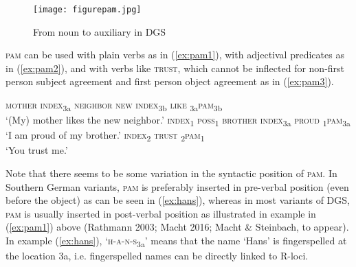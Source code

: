 \documentclass[11pt,a4paper,fleqn]{article}
\begin{document}
\begin{figure}[h]
    \centering
	\texttt{[image: figurepam.jpg]}
    \caption{From noun to auxiliary in DGS} \label{fig:schwan4}
\end{figure}


\textsc{pam} can be used with plain verbs as in (\ref{ex:pam1}), with adjectival predicates as in (\ref{ex:pam2}), and with verbs like \textsc{trust}, which cannot be inflected for non-first person subject agreement and first person object agreement as in (\ref{ex:pam3}).


\begin{exe}
\ex  \label{ex:pam}
\begin{xlist}	
\ex \textsc{mother}  \textsc{index}\textsubscript{3a}  \textsc{neighbor new}  \textsc{index}\textsubscript{3b} \textsc{like}   \textsubscript{3a}\textsc{pam}\textsubscript{3b}	\\
		‘(My) mother likes the new neighbor.’ \label{ex:pam1}
	\ex	\textsc{index}\textsubscript{1}  \textsc{poss}\textsubscript{1}  \textsc{brother}  \textsc{index}\textsubscript{3a}  \textsc{proud}   \textsubscript{1}\textsc{pam}\textsubscript{3a}\\
		‘I am proud of my brother.’ \label{ex:pam2}
	\ex	\textsc{index}\textsubscript{2}  \textsc{trust}   \textsubscript{2}\textsc{pam}\textsubscript{1}\\
		‘You trust me.’	\label{ex:pam3}
\end{xlist}
\end{exe}

%

Note that there seems to be some variation in the syntactic position of \textsc{pam}. In Southern German variants, \textsc{pam} is preferably inserted in pre-verbal position (even before the object) as can be seen in (\ref{ex:hans}), whereas in most variants of DGS, \textsc{pam} is usually inserted in post-verbal position as illustrated in example in (\ref{ex:pam1}) above (Rathmann 2003; Macht 2016; Macht \& Steinbach, to appear). In example (\ref{ex:hans}), ‘\textsc{h-a-n-s}\textsubscript{3a}' means that the name ‘Hans' is fingerspelled at the location 3a, i.e. fingerspelled names can be directly linked to R-loci. 
\end{document}
